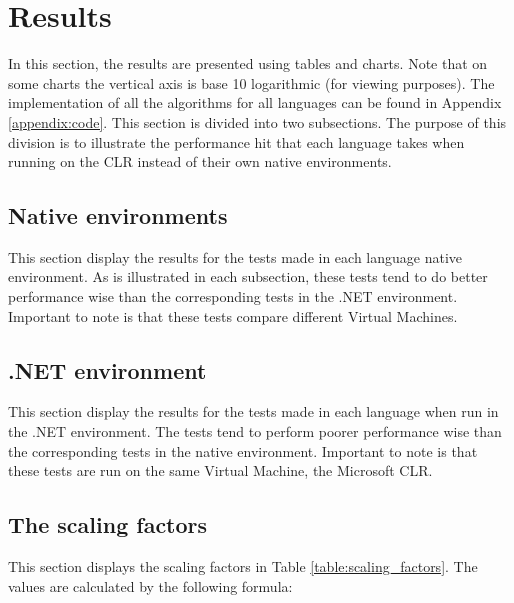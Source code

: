 \section{Results}
In this section, the results are presented using tables and charts. Note that on some charts the vertical axis is base 10 logarithmic (for viewing purposes). The implementation of all the algorithms for all languages can be found in Appendix \ref{appendix:code}. This section is divided into two subsections. The purpose of this division is to illustrate the performance hit that each language takes when running on the CLR instead of their own native environments.

\subsection{Native environments}
This section display the results for the tests made in each language native environment. As is illustrated in each subsection, these tests tend to do better performance wise than the corresponding tests in the .NET environment. Important to note is that these tests compare different Virtual Machines.







\subsection{.NET environment} \label{subsec:net_environment}
This section display the results for the tests made in each language when run in the .NET environment. The tests tend to perform poorer performance wise than the corresponding tests in the native environment. Important to note is that these tests are run on the same Virtual Machine, the Microsoft CLR.









\subsection{The scaling factors}
This section displays the scaling factors in Table \ref{table:scaling_factors}. The values are calculated by the following formula:
\newline
\newline
\centerline{  }
\newline
\newline


